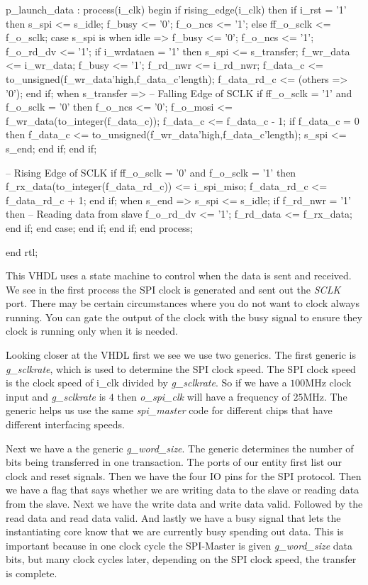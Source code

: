 \begin{VHDLlisting}[tabsize=4]
	p_launch_data : process(i_clk)
	begin
		if rising_edge(i_clk) then
			if i_rst = '1' then
				s_spi <= s_idle;
				f_busy <= '0';
				f_o_ncs <= '1';
			else
				ff_o_sclk <= f_o_sclk;
				case s_spi is
					when idle =>
						f_busy <= '0';
						f_o_ncs <= '1';
						f_o_rd_dv <= '1';
						if i_wrdataen = '1' then
							s_spi <= s_transfer;
							f_wr_data <= i_wr_data;
							f_busy <= '1';
							f_rd_nwr <= i_rd_nwr;
							f_data_c <= to_unsigned(f_wr_data'high,f_data_c'length);
							f_data_rd_c <= (others => '0');
						end if;
					when s_transfer => 
						-- Falling Edge of SCLK
						if ff_o_sclk = '1' and f_o_sclk = '0' then
							f_o_ncs <= '0';
							f_o_mosi <= f_wr_data(to_integer(f_data_c));
							f_data_c <= f_data_c - 1;
							if f_data_c = 0 then
								f_data_c <= to_unsigned(f_wr_data'high,f_data_c'length);
								s_spi <= s_end;
							end if;
						end if;					

						-- Rising Edge of SCLK
						if ff_o_sclk = '0' and f_o_sclk = '1' then
							f_rx_data(to_integer(f_data_rd_c)) <= i_spi_miso;
							f_data_rd_c <= f_data_rd_c + 1;
						end if;
					when s_end => 
						s_spi <= s_idle;
						if f_rd_nwr = '1' then
							-- Reading data from slave
							f_o_rd_dv <= '1';
							f_rd_data <= f_rx_data;
						end if;				
				end case;
			end if;
		end if;	
	end process;


end rtl;
\end{VHDLlisting}

This \ac{VHDL} uses a state machine to control when the data is sent and received. We see in the first process the \ac{SPI} clock is generated and sent out the \emph{SCLK} port. There may be certain circumstances where you do not want to clock always running. You can gate the output of the clock with the busy signal to ensure they clock is running only when it is needed. 

Looking closer at the \ac{VHDL} first we see we use two generics. The first generic is \emph{g\_sclkrate}, which is used to determine the \ac{SPI} clock speed. The \ac{SPI} clock speed is the clock speed of i\_clk divided by \emph{g\_sclkrate}. So if we have a $100$\ac{MHz} clock input and \emph{g\_sclkrate} is $4$ then \emph{o\_spi\_clk} will have a frequency of $25$\ac{MHz}. The generic helps us use the same \emph{spi\_master} code for different chips that have different interfacing speeds. 

Next we have a the generic \emph{g\_word\_size}. The generic determines the number of bits being transferred in one transaction. The ports of our entity first list our clock and reset signals. Then we have the four \ac{IO} pins for the \ac{SPI} protocol. Then we have a flag that says whether we are writing data to the slave or reading data from the slave. Next we have the write data and write data valid. Followed by the read data and read data valid. And lastly we have a busy signal that lets the instantiating core know that we are currently busy spending out data. This is important because in one clock cycle the \ac{SPI}-Master is given \emph{g\_word\_size} data bits, but many clock cycles later, depending on the \ac{SPI} clock speed, the transfer is complete. 


